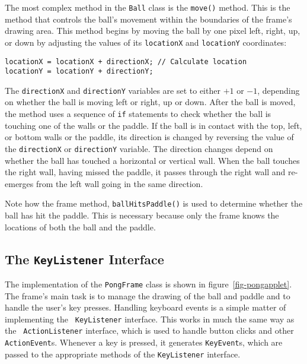 The most complex method in the {\tt Ball} class is the {\tt move()}
method. This is the method that controls the ball's movement within
the boundaries of the frame's drawing area. This method begins
by moving the ball by one pixel left, right, up, or down by adjusting
the values of its {\tt locationX} and {\tt locationY} coordinates:

\begin{jjjlisting}
\begin{lstlisting}
locationX = locationX + directionX; // Calculate location
locationY = locationY + directionY;
\end{lstlisting}
\end{jjjlisting}

\noindent The {\tt directionX} and {\tt directionY} variables are set
to either $+1$ or $-1$, depending on whether the ball is moving left
or right, up or down. After the ball is moved, the method uses a
sequence of {\tt if} statements to check whether the ball is touching
one of the walls or the paddle.  If the ball is in contact with the
top, left, or bottom walls or the paddle, its direction is changed by
reversing the value of the {\tt directionX} or {\tt directionY}
variable. The direction changes depend on whether the ball has touched
a horizontal or vertical wall. When the ball touches the right wall,
having missed the paddle, it passes through the right wall and
re-emerges from the left wall going in the same direction.

Note how the frame method, {\tt ballHitsPaddle()} is used to
determine whether the ball has hit the paddle. This is necessary
because only the frame knows the locations of both the ball and the
paddle.

\subsection{The {\tt KeyListener} Interface}

The implementation of the {\tt PongFrame} class is shown in
figure~\ref{fig-pongapplet}. The frame's main task is to manage the
drawing of the ball and paddle and to handle the user's key presses.
Handling keyboard events is a simple matter of implementing the {\tt
KeyListener} interface. This works in much the same way as the {\tt
ActionListener} interface, which is used to handle button clicks and
other {\tt ActionEvent}s.  Whenever a key is pressed, it generates
{\tt KeyEvent}s, which are passed to the appropriate methods of the
{\tt KeyListener} interface.

